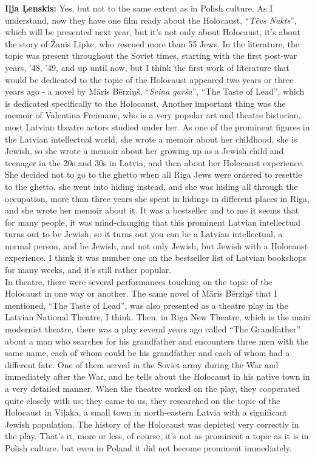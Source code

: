 \textbf{Iļja Ļenskis:} Yes, but not to the same extent as in Polish culture. As I understand, now they have one film ready about the Holocaust, ``\textit{Tēvs Nakts}'', which will be presented next year, but it’s not only about Holocaust, it’s about the story of Žanis Lipke, who rescued more than 55 Jews. In the literature, the topic was present throughout the Soviet times, starting with the first post-war years, '48, '49, and up until now, but I think the first work of literature that would be dedicated to the topic of the Holocaust appeared two years or three years ago - a novel by Māris Bērziņš, “\textit{Svina garša}”, ``The Taste of Lead'', which is dedicated specifically to the Holocaust. Another important thing was the memoir of Valentīna Freimane, who is a very popular art and theatre historian, most Latvian theatre actors studied under her. As one of the prominent figures in the Latvian intellectual world, she wrote a memoir about her childhood, she is Jewish, so she wrote a memoir about her growing up as a Jewish child and teenager in the 20s and 30s in Latvia, and then about her Holocaust experience. She decided not to go to the ghetto when all Riga Jews were ordered to resettle to the ghetto, she went into hiding instead, and she was hiding all through the occupation, more than three years she spent in hidings in different places in Riga, and she wrote her memoir about it. It was a bestseller and to me it seems that for many people, it was mind-changing that this prominent Latvian intellectual turns out to be Jewish, so it turns out you can be a Latvian intellectual, a normal person, and be Jewish, and not only Jewish, but Jewish with a Holocaust experience. I think it was number one on the bestseller list of Latvian bookshops for many weeks, and it’s still rather popular. \\
In theatre, there were several performances touching on the topic of the Holocaust in one way or another. The same novel of Māris Bērziņš that I mentioned, “The Taste of Lead”, was also presented as a theatre play in the Latvian National Theatre, I think. Then, in Riga New Theatre, which is the main modernist theatre, there was a play several years ago called “The Grandfather” about a man who searches for his grandfather and encounters three men with the same name, each of whom could be his grandfather and each of whom had a different fate. One of them served in the Soviet army during the War and immediately after the War, and he tells about the Holocaust in his native town in a very detailed manner. When the theatre worked on the play, they cooperated quite closely with us; they came to us, they researched on the topic of the Holocaust in Viļaka, a small town in north-eastern Latvia with a significant Jewish population. The history of the Holocaust was depicted very correctly in the play. That’s it, more or less, of course, it’s not as prominent a topic as it is in Polish culture, but even in Poland it did not become prominent immediately.


